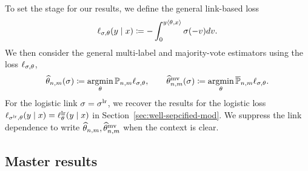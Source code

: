 To set the stage for our results, we define the
general link-based loss
\begin{equation*}
  \ell_{\sigma,\theta} (y \mid x) \coloneqq -\int_0^{y \langle\theta, x\rangle} \sigma(-v) dv.
\end{equation*}
We then consider the general multi-label and majority-vote
estimators using the loss $\ell_{\sigma,\theta}$,
\begin{equation}
  \label{eqn:general-estimators}
  \widehat{\theta}_{n,m}(\sigma) \coloneqq \operatorname*{argmin}_\theta \mathbb{P}_{n,m} \ell_{\sigma, \theta},
  \qquad
  \widehat{\theta}^{\textup{mv}}_{n,m}(\sigma) \coloneqq \operatorname*{argmin}_\theta \overline{\mathbb{P}}_{n,m} \ell_{\sigma, \theta}.
\end{equation}
For the logistic link $\sigma = \sigma^{\textup{lr}}$, we recover the
results for the 
logistic loss
$\ell_{\sigma^{\textup{lr}},\theta} (y \mid x) = \ell_\theta^{\textup{lr}}(y \mid x)$ in Section~\ref{sec:well-sepcified-mod}.
We suppress the link dependence
to write $\widehat{\theta}_{n,m}, \widehat{\theta}^{\textup{mv}}_{n,m}$ when the context is clear.


\subsection{Master results} \label{sec:master-results}

